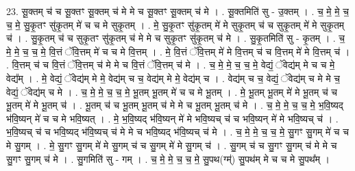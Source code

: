 \documentclass[17pt]{extarticle}
\begin{document}
23. सू॒क्तम् च॑ च सू॒क्तꣳ सू॒क्तम् च॑ मे मे च सू॒क्तꣳ सू॒क्तम् च॑ मे । . सू॒क्तमिति॑ सु - उ॒क्तम् । . च॒ मे॒ मे॒ च॒ च॒ मे॒ सु॒कृ॒तꣳ सु॑कृ॒तम् मे॑ च च मे सुकृ॒तम् । . मे॒ सु॒कृ॒तꣳ सु॑कृ॒तम् मे॑ मे सुकृ॒तम् च॑ च सुकृ॒तम् मे॑ मे सुकृ॒तम् च॑ । . सु॒कृ॒तम् च॑ च सुकृ॒तꣳ सु॑कृ॒तम् च॑ मे मे च सुकृ॒तꣳ सु॑कृ॒तम् च॑ मे । . सु॒कृ॒तमिति॑ सु - कृ॒तम् । . च॒ मे॒ मे॒ च॒ च॒ मे॒ वि॒त्तं ॅवि॒त्तम् मे॑ च च मे वि॒त्तम् । . मे॒ वि॒त्तं ॅवि॒त्तम् मे॑ मे वि॒त्तम् च॑ च वि॒त्तम् मे॑ मे वि॒त्तम् च॑ । . वि॒त्तम् च॑ च वि॒त्तं ॅवि॒त्तम् च॑ मे मे च वि॒त्तं ॅवि॒त्तम् च॑ मे । . च॒ मे॒ मे॒ च॒ च॒ मे॒ वेद्यं॒ ॅवेद्य॑म् मे च च मे॒ वेद्य᳚म् । . मे॒ वेद्यं॒ ॅवेद्य॑म् मे मे॒ वेद्य॑म् च च॒ वेद्य॑म् मे मे॒ वेद्य॑म् च । . वेद्य॑म् च च॒ वेद्यं॒ ॅवेद्य॑म् च मे मे च॒ वेद्यं॒ ॅवेद्य॑म् च मे । . च॒ मे॒ मे॒ च॒ च॒ मे॒ भू॒तम् भू॒तम् मे॑ च च मे भू॒तम् । . मे॒ भू॒तम् भू॒तम् मे॑ मे भू॒तम् च॑ च भू॒तम् मे॑ मे भू॒तम् च॑ । . भू॒तम् च॑ च भू॒तम् भू॒तम् च॑ मे मे च भू॒तम् भू॒तम् च॑ मे । . च॒ मे॒ मे॒ च॒ च॒ मे॒ भ॒वि॒ष्यद् भ॑वि॒ष्यन् मे॑ च च मे भवि॒ष्यत् । . मे॒ भ॒वि॒ष्यद् भ॑वि॒ष्यन् मे॑ मे भवि॒ष्यच् च॑ च भवि॒ष्यन् मे॑ मे भवि॒ष्यच् च॑ । . भ॒वि॒ष्यच् च॑ च भवि॒ष्यद् भ॑वि॒ष्यच् च॑ मे मे च भवि॒ष्यद् भ॑वि॒ष्यच् च॑ मे । . च॒ मे॒ मे॒ च॒ च॒ मे॒ सु॒गꣳ सु॒गम् मे॑ च च मे सु॒गम् । . मे॒ सु॒गꣳ सु॒गम् मे॑ मे सु॒गम् च॑ च सु॒गम् मे॑ मे सु॒गम् च॑ । . सु॒गम् च॑ च सु॒गꣳ सु॒गम् च॑ मे मे च सु॒गꣳ सु॒गम् च॑ मे । . सु॒गमिति॑ सु - गम् । . च॒ मे॒ मे॒ च॒ च॒ मे॒ सु॒पथ(ग्म्॑) सु॒पथ॑म् मे च च मे सु॒पथ᳚म् । \newline
\end{document}
